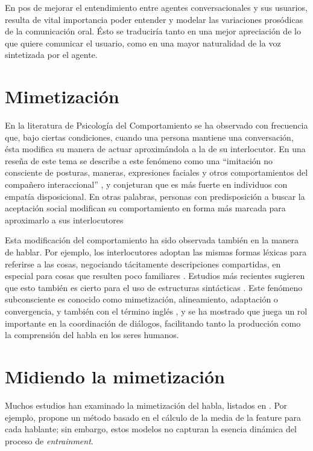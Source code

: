 En pos de mejorar el entendimiento entre agentes conversacionales y sus usuarios, resulta de vital importancia poder entender y modelar las variaciones prosódicas de la comunicación oral. Ésto se traduciría tanto en una mejor apreciación de lo que quiere comunicar el usuario, como en una mayor naturalidad de la voz sintetizada por el agente.

\section{Mimetización}

En la literatura de Psicología del Comportamiento se ha observado con frecuencia que, bajo ciertas condiciones, cuando una persona mantiene una conversación, ésta modifica su manera de actuar aproximándola a la de su interlocutor. En una reseña de este tema se describe a este fenómeno como una ``imitación no consciente de posturas, maneras, expresiones faciales y otros comportamientos del compañero interaccional'' \cite[p. 893]{CHAR1999} , y conjeturan que es más fuerte en individuos con empatía disposicional. En otras palabras, personas con predisposición a buscar la aceptación social modifican su comportamiento en forma más marcada para aproximarlo a sus interlocutores


Esta modificación del comportamiento ha sido observada también en la manera de hablar. Por ejemplo, los interlocutores adoptan las mismas formas léxicas para referirse a las cosas, negociando tácitamente descripciones compartidas, en especial para cosas que resulten poco familiares \cite{BRE1996}. Estudios más recientes sugieren que esto también es cierto para el uso de estructuras sintácticas \cite{REI2006}. Este fenómeno subconsciente es conocido como mimetización, alineamiento, adaptación o convergencia, y también con el término inglés \entrainment, y se ha mostrado que juega un rol importante en la coordinación de diálogos, facilitando tanto la producción como la comprensión del habla en los seres humanos.

\section{Midiendo la mimetización}

Muchos estudios han examinado la mimetización del habla, listados en \cite{DEL2013}. Por ejemplo, \cite{LEV2012} propone un método basado en el cálculo de la media de la feature para cada hablante; sin embargo, estos modelos no capturan la esencia dinámica del proceso de \emph{entrainment}.

